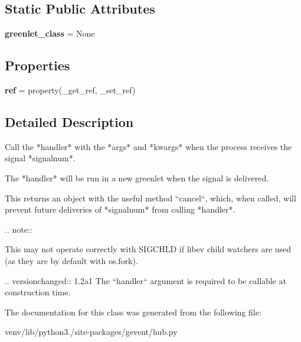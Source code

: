 \subsection*{Static Public Attributes}
\begin{DoxyCompactItemize}
\item 
\mbox{\label{classgevent_1_1hub_1_1signal_ae6eef525808dd35060adb9a204fb303a}} 
{\bfseries greenlet\+\_\+class} = None
\end{DoxyCompactItemize}
\subsection*{Properties}
\begin{DoxyCompactItemize}
\item 
\mbox{\label{classgevent_1_1hub_1_1signal_a00dfa17b80b99b7e7803bc5987bf1bbd}} 
{\bfseries ref} = property(\+\_\+get\+\_\+ref, \+\_\+set\+\_\+ref)
\end{DoxyCompactItemize}


\subsection{Detailed Description}
\begin{DoxyVerb}Call the *handler* with the *args* and *kwargs* when the process
receives the signal *signalnum*.

The *handler* will be run in a new greenlet when the signal is delivered.

This returns an object with the useful method ``cancel``, which, when called,
will prevent future deliveries of *signalnum* from calling *handler*.

.. note::

    This may not operate correctly with SIGCHLD if libev child watchers
    are used (as they are by default with os.fork).

.. versionchanged:: 1.2a1
   The ``handler`` argument is required to be callable at construction time.
\end{DoxyVerb}
 

The documentation for this class was generated from the following file\+:\begin{DoxyCompactItemize}
\item 
venv/lib/python3./site-\/packages/gevent/hub.\+py\end{DoxyCompactItemize}
